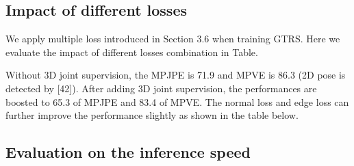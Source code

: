 \documentclass[sigconf]{acmart}
\begin{document}
\subsection{Impact of different losses}
We apply multiple loss introduced in Section 3.6 when training GTRS. Here we evaluate the impact of different losses combination in Table. 

\begin{table}[htp]
\small
\centering
  \caption{ Comparison of the inference speed. The frame per second (fps) is obtained by using batch size 1 on a single GPU/CPU.}
\label{tab: fps}
\vspace{-5pt}
\end{table}

Without 3D joint supervision, the MPJPE is 71.9 and MPVE is 86.3 (2D pose is detected by [42]). After adding 3D joint supervision, the performances are boosted to 65.3 of MPJPE and 83.4 of MPVE. The normal loss and edge loss can further improve the performance slightly as shown in the table below.


\subsection{Evaluation on the inference speed}
\end{document}
